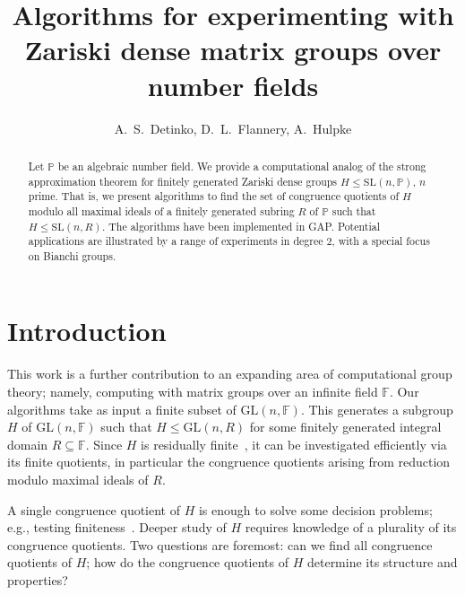 \documentclass[11pt]{amsart}
\theoremstyle{definition}
\theoremstyle{remark}
\newcommand{\F}{\mathbb{F}}
\renewcommand{\P}{\mathbb{P}}
\newcommand{\GL}{\mathrm{GL}}
\newcommand{\SL}{\mathrm{SL}}
\begin{document}
\title[Experimenting with Zariski dense matrix groups
over number fields]
{Algorithms for experimenting with Zariski dense matrix groups
over number fields}

\author{A.~S.~Detinko, D.~L.~Flannery, A.~Hulpke}

\makeatletter
{}
\makeatother


\begin{abstract}
Let $\P$ be an algebraic number field. We provide a computational
 analog of the strong approximation theorem for finitely
generated Zariski dense groups $H\leq \SL(n,\P)$, $n$ prime.
That is, we present algorithms to find the set of congruence 
quotients of $H$ modulo all maximal ideals of a finitely
generated subring $R$ of $\P$ such that $H\leq \SL(n,R)$.
 The algorithms have been implemented in {\sf GAP}. 
 Potential applications are illustrated by a range of 
experiments in degree $2$, with a special focus 
on Bianchi groups.
\end{abstract}

\maketitle


\vspace{-20pt}

\section{Introduction}

This work is a further contribution to an expanding 
area of computational group theory; namely, computing 
with matrix groups over an infinite field $\F$. Our algorithms
take as input a finite subset of $\GL(n,\F)$. This generates 
a subgroup $H$ of $\GL(n,\F)$ such that $H\leq \GL(n, R)$ for 
some finitely generated integral domain $R\subseteq \F$. 
Since $H$ is residually finite~\cite[4.2]{Wehrfritz},
 it can be investigated efficiently via its finite quotients, in 
particular the congruence quotients arising from reduction
 modulo maximal ideals of $R$.

 A single congruence quotient of $H$ is enough to solve some decision
problems; e.g., testing finiteness~\cite{Recog}. Deeper study of $H$
requires knowledge of a plurality of its congruence quotients. Two 
questions are foremost: can we find all congruence quotients of $H$; 
how do the congruence quotients of $H$ determine its structure and properties?
\end{document}
